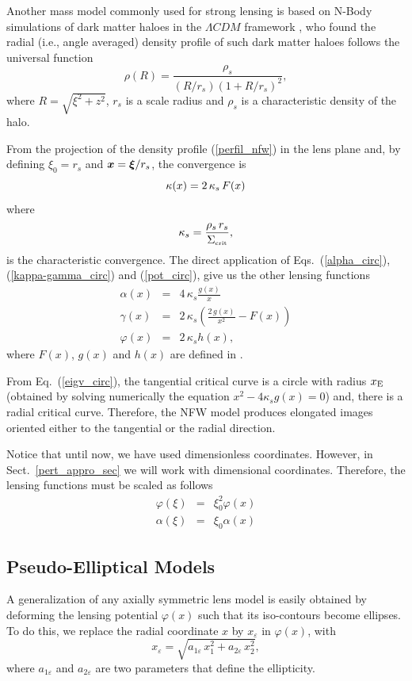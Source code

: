 \documentclass[useAMS,usenatbib]{mn2e}
\begin{document}
Another mass model commonly used for strong lensing is based on N-Body simulations of dark matter haloes in the $\Lambda CDM$ framework \citep[][hereafter NFW]{nfw96,nfw97}, who found the radial (i.e., angle averaged) density profile of such dark matter haloes follows the universal function
\begin{equation}
 \rho(R)=\frac{\rho_s}{(R/r_s)(1+R/r_s)^2},
 \label{perfil_nfw}
\end{equation}
where $ R=\sqrt{\xi^2+z^2}$, $r_s$ is a scale radius and $\rho_s$ is a characteristic density of the halo.

From the projection of the density profile (\ref{perfil_nfw}) in the lens plane and, by defining $\xi_0=r_s$ and $\bmath{x}=\bmath{\xi}/r_s$, the convergence is
\begin{equation}
\kappa(x) = 2\, \kappa_s\,F(x) \label{kappa_nfw}\\
\end{equation}
where 
\[
\kappa_s=\frac{\rho_s\,r_s}{\Sigma_{\mbox{\tiny crit}}},
\]
is the characteristic convergence. The direct application of Eqs.~(\ref{alpha_circ}), (\ref{kappa-gamma_circ}) and (\ref{pot_circ}), give us  the other lensing functions 
\begin{eqnarray}
\alpha(x) &=& 4\,\kappa_s\frac{g(x)}{x}\label{alpha_nfw} \nonumber \\
\gamma(x) &=& 2\,\kappa_s\left(\frac{2\,g(x)}{x^2}-F(x)\right) \label{shear_nfw}\\
\varphi(x)&=& 2\,\kappa_s h(x),\label{pot_nfw} \nonumber
\end{eqnarray}
\noindent where $F(x)$, $g(x)$  and $h(x)$ are defined in \citet{gk02}.

From Eq.~(\ref{eigv_circ}), the tangential critical curve is a circle with radius $x_{\rm E}$ (obtained by solving numerically the equation $x^2-4\kappa_s g(x)=0$)  and, there is a radial critical curve. Therefore, the NFW model produces elongated images oriented either to the tangential or the radial direction.

Notice that until now, we have used dimensionless coordinates. However, in Sect.~\ref{pert_appro_sec} we will work with dimensional coordinates. Therefore, the lensing functions  must be scaled as follows \citep{bartelmann03}
\begin{eqnarray*}
\varphi(\xi)&=&\xi^2_0\varphi(x)\\
\alpha(\xi)&=&\xi_0\alpha(x)
\end{eqnarray*}

\subsection{Pseudo-Elliptical Models}
A generalization of any axially symmetric lens model is easily obtained by deforming the lensing potential $\varphi(x)$ such that its iso-contours become ellipses. To do this, we replace the radial coordinate $x$ by $x_\varepsilon$ in $\varphi(x)$, with 
\begin{equation}
 x_\varepsilon =\sqrt{a_{1\varepsilon}\,x^2_1+a_{2\varepsilon}\,x^2_2},%
\label{subti-ellip}
\end{equation}
\noindent where $a_{1\varepsilon}$ and $a_{2\varepsilon}$ are two parameters that define the ellipticity.
\end{document}
